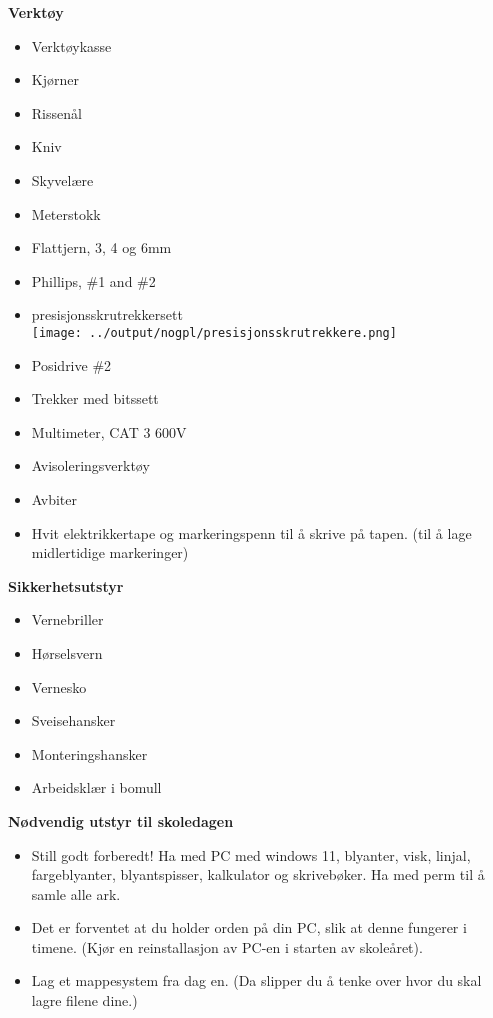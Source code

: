 \documentclass[12pt,a4paper]{article}
\begin{document}
\noindent
{\bf Verktøy}
\begin{itemize}[itemsep=1mm, parsep=0pt]
	\item Verktøykasse
	\item Kjørner
	\item Rissenål
	\item Kniv
	\item Skyvelære
	\item Meterstokk
	\item Flattjern, 3, 4 og 6mm
	\item Phillips, \#1 and \#2
	\item presisjonsskrutrekkersett\\
       \texttt{[image: ../output/nogpl/presisjonsskrutrekkere.png]}
	\item Posidrive \#2
	\item Trekker med bitssett
	\item Multimeter, CAT 3 600V 
	\item Avisoleringsverktøy
	\item Avbiter
	\item Hvit elektrikkertape og markeringspenn til å skrive på tapen. (til å lage midlertidige markeringer)
\medskip
\end{itemize}
\vskip 10pt

\noindent
{\bf Sikkerhetsutstyr}
\begin{itemize}[itemsep=1mm, parsep=0pt]
	\item Vernebriller
	\item Hørselsvern
	\item Vernesko
	\item Sveisehansker
	\item Monteringshansker
	\item Arbeidsklær i bomull
\medskip
\end{itemize}
\vskip 10pt

\noindent
{\bf Nødvendig utstyr til skoledagen}
\begin{itemize}[itemsep=1mm, parsep=0pt]
	
	\item Still godt forberedt! Ha med PC med windows 11, blyanter, visk, linjal, fargeblyanter, blyantspisser, kalkulator og skrivebøker. Ha med perm til å samle alle ark.
	\item Det er forventet at du holder orden på din PC, slik at denne fungerer i timene. (Kjør en reinstallasjon av PC-en i starten av skoleåret). 
	\item Lag et mappesystem fra dag en. (Da slipper du å tenke over hvor du skal lagre filene dine.)
\medskip
\end{itemize}
\vskip 10pt



\vfil

\eject







\eject
\end{document}
